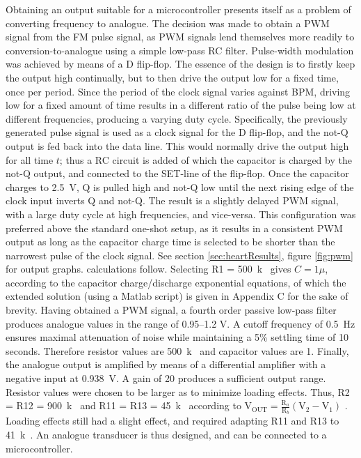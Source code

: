 Obtaining an output suitable for a microcontroller presents itself as a problem of converting frequency to analogue. The decision was made to obtain a PWM signal from the FM pulse signal, as PWM signals lend themselves more readily to conversion-to-analogue using a simple low-pass RC filter. Pulse-width modulation was achieved by means of a D flip-flop. The essence of the design is to firstly keep the output high continually, but to then drive the output low for a fixed time, once per period. Since the period of the clock signal varies against BPM, driving low for a fixed amount of time results in a different ratio of the pulse being low at different frequencies, producing a varying duty cycle. Specifically, the previously generated pulse signal is used as a clock signal for the D flip-flop, and the not-Q output is fed back into the data line. This would normally drive the output high for all time $t$; thus a RC circuit is added of which the capacitor is charged by the not-Q output, and connected to the SET-line of the flip-flop. Once the capacitor charges to \SI{2.5}{V}, Q is pulled high and not-Q low until the next rising edge of the clock input inverts Q and not-Q. The result is a slightly delayed PWM signal, with a large duty cycle at high frequencies, and vice-versa. This configuration was preferred above the standard one-shot setup, as it results in a consistent PWM output as long as the capacitor charge time is selected to be shorter than the narrowest pulse of the clock signal. See section \ref{sec:heartResults}, figure \ref{fig:pwm} for output graphs.  calculations follow. Selecting R1 = \SI{500}{k\Omega} gives $C = 1\mu$, according to the capacitor charge/discharge exponential equations, of which the extended solution (using a Matlab script) is given in Appendix C for the sake of brevity. Having obtained a PWM signal, a fourth order passive low-pass filter produces analogue values in the range of \numrange{0.95}{1.2} \si{V}. A cutoff frequency of \SI{0.5}{Hz} ensures maximal attenuation of noise while maintaining a 5\% settling time of 10 seconds. Therefore resistor values are \SI{500}{k\Omega} and capacitor values are \SI{1}{\mu}. Finally, the analogue output is amplified by means of a differential amplifier with a negative input at \SI{0.938}{V}. A gain of 20 produces a sufficient output range. Resistor values were chosen to be larger as to minimize loading effects. Thus, R2 = R12 = \SI{900}{k\Omega} and R11 = R13 = \SI{45}{k\Omega} according to $\mathrm{V}_{\mathrm{OUT}}=\frac{\mathrm{R}_{a}}{\mathrm{R}_{b}}\left(\mathrm{V}_{2}-\mathrm{V}_{1}\right)$ \cite{opamp}. Loading effects still had a slight effect, and required adapting R11 and R13 to \SI{41}{k\Omega}. An analogue transducer is thus designed, and can be connected to a microcontroller.

